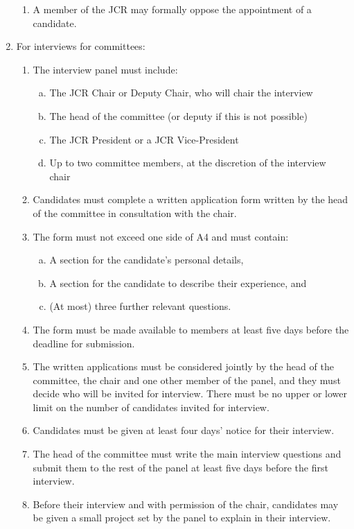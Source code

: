 \documentclass[12pt]{article}  %
\begin{document}
\begin{enumerate}
\begin{enumerate}
        \item A member of the JCR may formally oppose the appointment of a candidate.
    \end{enumerate}
    \item For interviews for committees:
    \begin{enumerate}
        \item The interview panel must include:
        \begin{enumerate}[(a)]
            \item The JCR Chair or Deputy Chair, who will chair the interview
            \item The head of the committee (or deputy if this is not possible)
            \item The JCR President or a JCR Vice-President
            \item  Up to two committee members, at the discretion of the interview chair
        \end{enumerate}
        \item Candidates must complete a written application form written by the head of the committee in consultation with the chair.
        \item The form must not exceed one side of A4 and must contain:
        \begin{enumerate}[(a)]
            \item A section for the candidate’s personal details,
            \item A section for the candidate to describe their experience, and
            \item (At most) three further relevant questions.
        \end{enumerate}
        \item The form must be made available to members at least five days before the deadline for submission.
        \item The written applications must be considered jointly by the head of the committee, the chair and one other member of the panel, and they must decide who will be invited for interview. There must be no upper or lower limit on the number of candidates invited for interview.
        \item Candidates must be given at least four days’ notice for their interview.
        \item The head of the committee must write the main interview questions and submit them to the rest of the panel at least five days before the first interview. 
        \item Before their interview and with permission of the chair, candidates may be given a small project set by the panel to explain in their interview.

\end{enumerate}
\end{enumerate}
\end{document}

